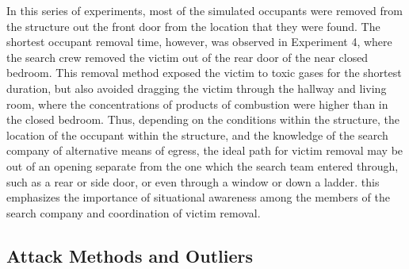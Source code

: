 \documentclass[12pt,oneside]{article}
\begin{document}
In this series of experiments, most of the simulated occupants were removed from the structure out the front door from the location that they were found. The shortest occupant removal time, however, was observed in Experiment 4, where the search crew removed the victim out of the rear door of the near closed bedroom. This removal method exposed the victim to toxic gases for the shortest duration, but also avoided dragging the victim through the hallway and living room, where the  concentrations of products of combustion were higher than in the closed bedroom. Thus, depending on the conditions within the structure, the location of the occupant within the structure, and the knowledge of the search company of alternative means of egress, the ideal path for victim removal may be out of an opening separate from the one which the search team entered through, such as a rear or side door, or even through a window or down a ladder. this emphasizes the importance of situational awareness among the members of the search company and coordination of victim removal. 

\subsection{Attack Methods and Outliers}
\label{subsec:fire_attack}
\end{document}
